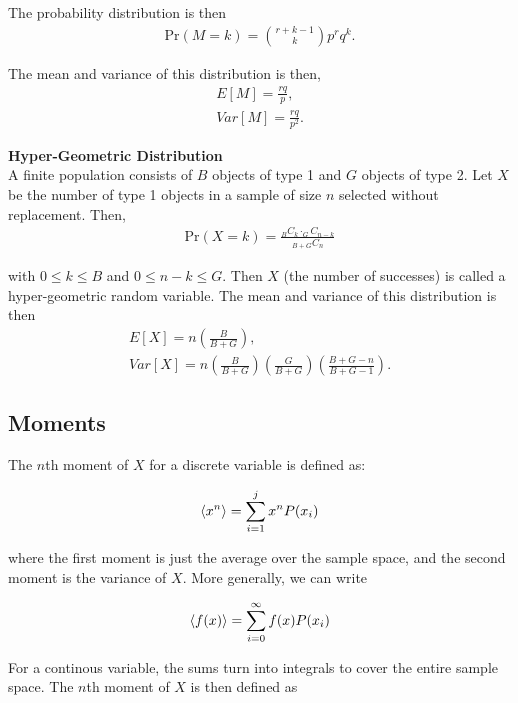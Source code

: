 \documentclass{article}
\numberwithin{theorem}{subsection}
\numberwithin{theorem}{subsubsection}
\theoremstyle{definition}
\numberwithin{definition}{subsection}
\numberwithin{definition}{subsubsection}
\begin{document}
\indent The probability distribution is then
\begin{gather*}
    \text{Pr}(M=k) = {r+k-1 \choose k} p^{r}q^{k}.
\end{gather*}

\noindent The mean and variance of this distribution is then,
\begin{gather*}
    E[M] = \frac{rq}{p},\\
    Var[M] = \frac{rq}{p^{2}}.
\end{gather*}

\noindent \textbf{Hyper-Geometric Distribution} \\
\indent A finite population consists of $B$ objects of type 1 and $G$ objects of type 2. Let $X$ be the number of type 1 objects in a sample of size $n$ selected without replacement. Then,
\begin{gather*}
    \text{Pr}(X = k) = \frac{_{B}C_{k} \cdot _{G}C_{n-k}}{_{B+G}C_{n}}
\end{gather*}

\noindent with $0 \leq k \leq B$ and $0 \leq n - k \leq G$. Then $X$ (the number of successes) is called a hyper-geometric random variable. The mean and variance of this distribution is then
\begin{gather*}
    E[X] = n\left ( \frac{B}{B+G}\right ),\\
    Var[X] = n\left ( \frac{B}{B+G}\right ) \left ( \frac{G}{B+G}\right ) \left ( \frac{B+G-n}{B+G-1}\right ).
\end{gather*}

\subsection{Moments}
The $n$th moment of $X$ for a discrete variable is defined as:

\begin{gather*}
    \braket{x^n} = \sum_{i=1}^{j}x^{n}P(x_{i})
\end{gather*}

\noindent where the first moment is just the average over the sample space, and the second moment is the variance of $X$. More generally, we can write

\begin{gather*}
    \braket{f(x)} = \sum_{i=0}^{\infty} f(x) P(x_{i})
\end{gather*}

\indent For a continous variable, the sums turn into integrals to cover the entire sample space. The $n$th moment of $X$ is then defined as
\end{document}
